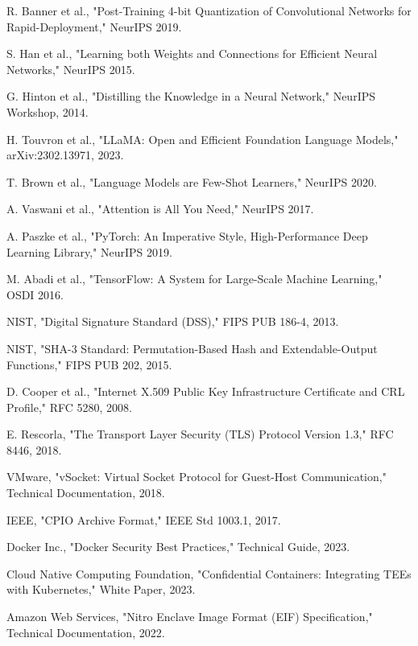 \documentclass[12pt,a4paper]{article}
\begin{document}
\begin{thebibliography}{99}
R. Banner et al., "Post-Training 4-bit Quantization of Convolutional Networks for Rapid-Deployment," NeurIPS 2019.

S. Han et al., "Learning both Weights and Connections for Efficient Neural Networks," NeurIPS 2015.

G. Hinton et al., "Distilling the Knowledge in a Neural Network," NeurIPS Workshop, 2014.

H. Touvron et al., "LLaMA: Open and Efficient Foundation Language Models," arXiv:2302.13971, 2023.

T. Brown et al., "Language Models are Few-Shot Learners," NeurIPS 2020.

A. Vaswani et al., "Attention is All You Need," NeurIPS 2017.

A. Paszke et al., "PyTorch: An Imperative Style, High-Performance Deep Learning Library," NeurIPS 2019.

M. Abadi et al., "TensorFlow: A System for Large-Scale Machine Learning," OSDI 2016.

NIST, "Digital Signature Standard (DSS)," FIPS PUB 186-4, 2013.

NIST, "SHA-3 Standard: Permutation-Based Hash and Extendable-Output Functions," FIPS PUB 202, 2015.

D. Cooper et al., "Internet X.509 Public Key Infrastructure Certificate and CRL Profile," RFC 5280, 2008.

E. Rescorla, "The Transport Layer Security (TLS) Protocol Version 1.3," RFC 8446, 2018.

VMware, "vSocket: Virtual Socket Protocol for Guest-Host Communication," Technical Documentation, 2018.

IEEE, "CPIO Archive Format," IEEE Std 1003.1, 2017.

Docker Inc., "Docker Security Best Practices," Technical Guide, 2023.

Cloud Native Computing Foundation, "Confidential Containers: Integrating TEEs with Kubernetes," White Paper, 2023.

Amazon Web Services, "Nitro Enclave Image Format (EIF) Specification," Technical Documentation, 2022.


\end{thebibliography}
\end{document}
